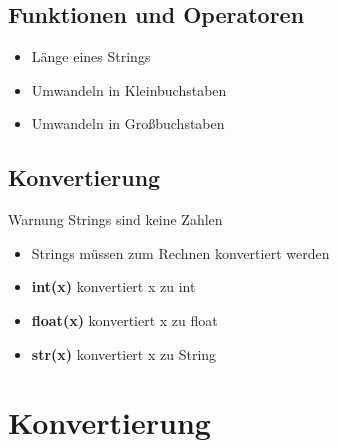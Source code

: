 \subsection{Funktionen und Operatoren}
\begin{frame}
    \slidehead

    \begin{itemize}
        \item Länge eines Strings

        \item Umwandeln in Kleinbuchstaben

        \item Umwandeln in Großbuchstaben
    \end{itemize}
\end{frame}


\subsection{Konvertierung}
\begin{frame}
    \slidehead
    \begin{block}{Warnung}
        Strings sind keine Zahlen
    \end{block}


    \pause

    \begin{itemize}
        \item Strings müssen zum Rechnen konvertiert werden
        \item \textbf{int(x)} konvertiert x zu int
        \item \textbf{float(x)} konvertiert x zu float
        \item \textbf{str(x)} konvertiert x zu String
    \end{itemize}

\end{frame}

\section{Konvertierung}
